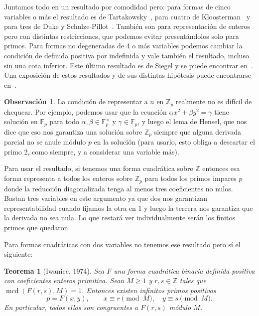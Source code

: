 \documentclass[a4paper]{book}
\theoremstyle{definition}
\newtheorem*{remark*}{Observación}
\theoremstyle{plain}
\newtheorem*{theorem*}{Teorema}
\DeclareMathOperator{\mcd}{mcd}
\newcommand{\ZZ}{\mathbb{Z}}
\newcommand{\FF}{\mathbb{F}}
\begin{document}
Juntamos todo en un resultado por comodidad pero: para formas de cinco variables o más el resultado es de Tartakowsky~\cite{Tartakowsky1929II}, para cuatro de Kloosterman~\cite{Kloosterman1926QuadraticForms} y para tres de Duke y Schulze-Pillot~\cite{DukeSchulzePillot1990}. También son para representación de enteros pero con distintas restricciones, que podemos evitar presentándolos solo para primos. Para formas no degeneradas de 4 o más variables podemos cambiar la condición de definida positiva por indefinida y vale también el resultado, incluso sin una cota inferior. Este último resultado es de Siegel y se puede encontrar en~\cite{Siegel1951Indefinite}. Una exposición de estos resultados y de sus distintas hipótesis puede encontrarse en~\cite{Hanke2004TernaryQuadraticForms}.

\begin{remark*}
La condición de representar a $n$ en $\ZZ_p$ realmente no es difícil de chequear. Por ejemplo, podemos usar que la ecuación $\alpha x^2 + \beta y^2 = \gamma$ tiene solución en $\FF_p$ para todo $\alpha, \beta \in \FF_p^\times$ y $\gamma\in \FF_p$, y luego el lema de Hensel, que nos dice que eso nos garantiza una solución sobre $\ZZ_p$ siempre que alguna derivada parcial no se anule módulo $p$ en la solución (para usarlo, esto obliga a descartar el primo 2, como siempre, y a considerar una variable más).

Para usar el resultado, si tenemos una forma cuadrática sobre $\ZZ$ entonces esa forma representa a todos los enteros sobre $\ZZ_p$ para todos los primos impares $p$ donde la reducción diagonalizada tenga al menos tres coeficientes no nulos. Bastan tres variables en este argumento ya que dos nos garantizan representabilidad cuando fijamos la otra en 1 y luego la tercera nos garantiza que la derivada no sea nula. Lo que restará ver individualmente serán los finitos primos que quedaron.
\end{remark*}

Para formas cuadráticas con dos variables no tenemos ese resultado pero sí el siguiente:

\begin{theorem*}[Iwaniec, 1974]
Sea $F$ una forma cuadrática binaria definida positiva con coeficientes enteros primitiva. Sean $M\geq1$ y $r,s\in\ZZ$ tales que $\mcd(F(r,s),M)=1$. Entonces existen infinitos primos positivos
\[
p=F(x,y),\qquad x\equiv r\pmod M,\quad y\equiv s\pmod M.
\]
En particular, todos ellos son congruentes a $F(r,s)$ módulo $M$.
\end{theorem*}
\end{document}
